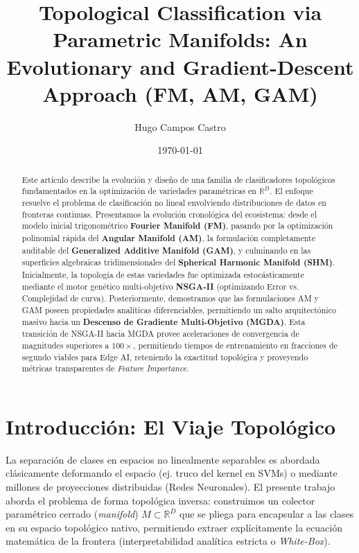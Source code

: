\documentclass[10pt,twocolumn,letterpaper]{article}
\title{\LARGE \bf
Topological Classification via Parametric Manifolds: An Evolutionary and Gradient-Descent Approach (FM, AM, GAM)
}
\author{Hugo Campos Castro}
\date{\today}
\begin{document}
\maketitle
\thispagestyle{empty}
\pagestyle{empty}

\begin{abstract}
Este artículo describe la evolución y diseño de una familia de clasificadores topológicos fundamentados en la optimización de variedades paramétricas en $\mathbb{R}^D$. El enfoque resuelve el problema de clasificación no lineal envolviendo distribuciones de datos en fronteras continuas. Presentamos la evolución cronológica del ecosistema: desde el modelo inicial trigonométrico \textbf{Fourier Manifold (FM)}, pasando por la optimización polinomial rápida del \textbf{Angular Manifold (AM)}, la formulación completamente auditable del \textbf{Generalized Additive Manifold (GAM)}, y culminando en las superficies algebraicas tridimensionales del \textbf{Spherical Harmonic Manifold (SHM)}. Inicialmente, la topología de estas variedades fue optimizada estocásticamente mediante el motor genético multi-objetivo \textbf{NSGA-II} (optimizando Error vs. Complejidad de curva). Posteriormente, demostramos que las formulaciones AM y GAM poseen propiedades analíticas diferenciables, permitiendo un salto arquitectónico masivo hacia un \textbf{Descenso de Gradiente Multi-Objetivo (MGDA)}. Esta transición de NSGA-II hacia MGDA provee aceleraciones de convergencia de magnitudes superiores a $100\times$, permitiendo tiempos de entrenamiento en fracciones de segundo viables para Edge AI, reteniendo la exactitud topológica y proveyendo métricas transparentes de \textit{Feature Importance}.
\end{abstract}

\section{Introducción: El Viaje Topológico}
La separación de clases en espacios no linealmente separables es abordada clásicamente deformando el espacio (ej. truco del kernel en SVMs) o mediante millones de proyecciones distribuidas (Redes Neuronales). El presente trabajo aborda el problema de forma topológica inversa: construimos un colector paramétrico cerrado (\textit{manifold}) $M \subset \mathbb{R}^D$ que se pliega para encapsular a las clases en su espacio topológico nativo, permitiendo extraer explícitamente la ecuación matemática de la frontera (interpretabilidad analítica estricta o \textit{White-Box}).
\end{document}
